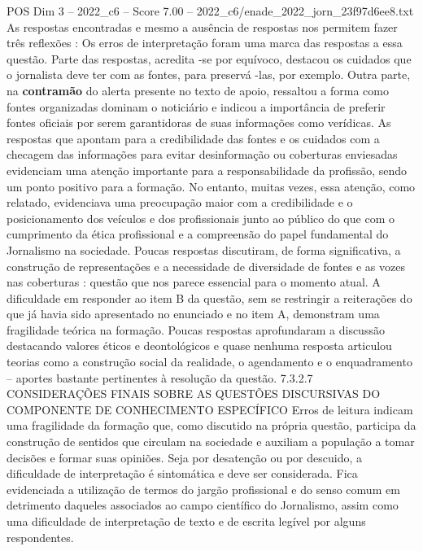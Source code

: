 \begin{textsample}{POS Dim 3 – 2022\_c6 – Score 7.00 – 2022\_c6/enade\_2022\_jorn\_23f97d6ee8.txt}
As respostas encontradas e mesmo a ausência de respostas nos permitem fazer três reflexões : Os erros de interpretação foram uma marca das respostas a essa questão.
Parte das respostas, acredita -se por equívoco, destacou os cuidados que o jornalista deve ter com as fontes, para preservá -las, por exemplo.
Outra parte, na \textbf{contramão} do alerta presente no texto de apoio, ressaltou a forma como fontes organizadas dominam o noticiário e indicou a importância de preferir fontes oficiais por serem garantidoras de suas informações como verídicas.
As respostas que apontam para a credibilidade das fontes e os cuidados com a checagem das informações para evitar desinformação ou coberturas enviesadas evidenciam uma atenção importante para a responsabilidade da profissão, sendo um ponto positivo para a formação.
No entanto, muitas vezes, essa atenção, como relatado, evidenciava uma preocupação maior com a credibilidade e o posicionamento dos veículos e dos profissionais junto ao público do que com o cumprimento da ética profissional e a compreensão do papel fundamental do Jornalismo na sociedade.
Poucas respostas discutiram, de forma significativa, a construção de representações e a necessidade de diversidade de fontes e as vozes nas coberturas : questão que nos parece essencial para o momento atual.
A dificuldade em responder ao item B da questão, sem se restringir a reiterações do que já havia sido apresentado no enunciado e no item A, demonstram uma fragilidade teórica na formação.
Poucas respostas aprofundaram a discussão destacando valores éticos e deontológicos e quase nenhuma resposta articulou teorias como a construção social da realidade, o agendamento e o enquadramento – aportes bastante pertinentes à resolução da questão. 7.3.2.7 CONSIDERAÇÕES FINAIS SOBRE AS QUESTÕES DISCURSIVAS DO COMPONENTE DE CONHECIMENTO ESPECÍFICO Erros de leitura indicam uma fragilidade da formação que, como discutido na própria questão, participa da construção de sentidos que circulam na sociedade e auxiliam a população a tomar decisões e formar suas opiniões.
Seja por desatenção ou por descuido, a dificuldade de interpretação é sintomática e deve ser considerada.
Fica evidenciada a utilização de termos do jargão profissional e do senso comum em detrimento daqueles associados ao campo científico do Jornalismo, assim como uma dificuldade de interpretação de texto e de escrita legível por alguns respondentes.

\end{textsample}
